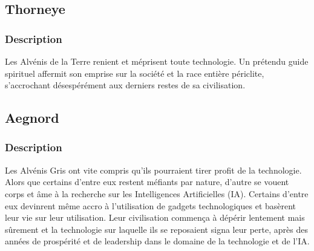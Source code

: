 \subsection{Thorneye}
\subsubsection{Description}
Les Alvénis de la Terre renient et méprisent toute technologie. Un prétendu guide spirituel affermit son emprise sur la société et la race entière périclite, s'accrochant désespérément aux derniers restes de sa civilisation.
\subsection{Aegnord} 
\subsubsection{Description}
Les Alvénis Gris ont vite compris qu'ils pourraient tirer profit de la technologie. Alors que certains d'entre eux restent méfiants par nature, d'autre se vouent corps et âme à la recherche sur les Intelligences Artificielles (IA). Certains d'entre eux devinrent même accro à l'utilisation de gadgets technologiques et basèrent leur vie sur leur utilisation. Leur civilisation commença à dépérir lentement mais sûrement et la technologie sur laquelle ils se reposaient signa leur perte, après des années de prospérité et de leadership dans le domaine de la technologie et de l'IA.
